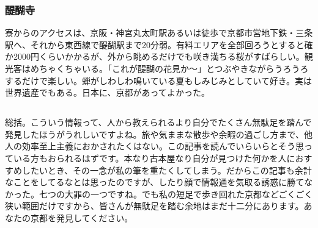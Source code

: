 \subsubsection{醍醐寺}
寮からのアクセスは、京阪・神宮丸太町駅あるいは徒歩で京都市営地下鉄・三条駅へ、それから東西線で醍醐駅まで20分弱。有料エリアを全部回ろうとすると確か2000円くらいかかるが、外から眺めるだけでも咲き満ちる桜がすばらしい。観光客はめちゃくちゃいる。「これが醍醐の花見か～」とつぶやきながらうろうろするだけで楽しい。蝉がしわしわ鳴いている夏もしみじみとしていて好き。実は世界遺産でもある。日本に、京都があってよかった。

\subsection*{}

総括。こういう情報って、人から教えられるより自分でたくさん無駄足を踏んで発見したほうがうれしいですよね。旅や気ままな散歩や余暇の過ごし方まで、他人の効率至上主義におかされたくはない。この記事を読んでいらいらとそう思っている方もおられるはずです。本なり古本屋なり自分が見つけた何かを人におすすめしたいとき、その一念が私の筆を重たくしてしまう。だからこの記事も余計なことをしてるなとは思ったのですが、したり顔で情報通を気取る誘惑に勝てなかった。七つの大罪の一つですね。でも私の短足で歩き回れた京都などごくごく狭い範囲だけですから、皆さんが無駄足を踏む余地はまだ十二分にあります。あなたの京都を発見してください。


